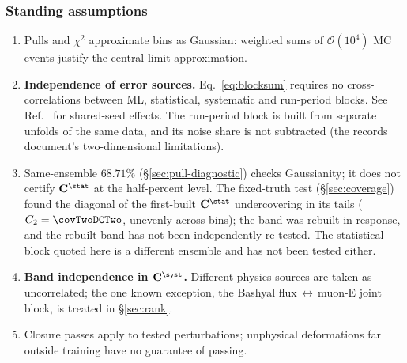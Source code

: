 \subsubsection*{Standing assumptions}

\begin{enumerate}[nosep]
  \item Pulls and $\chi^{2}$ approximate bins as Gaussian: weighted sums of $\mathcal{O}(10^{4})$ MC events justify the central-limit approximation.
\item \textbf{Independence of error sources.} Eq.~\eqref{eq:blocksum} requires no cross-correlations between ML, statistical, systematic and run-period blocks. See Ref.~\cite{NoteRecords2026} for shared-seed effects. The run-period block is built from separate unfolds of the same data, and its noise share is not subtracted (the records document's two-dimensional limitations).
  \item Same-ensemble $68.71\%$ (\S\ref{sec:pull-diagnostic}) checks Gaussianity; it does not certify $\mathbf{C}^{\stat}$ at the half-percent level. The fixed-truth test (\S\ref{sec:coverage}) found the diagonal of the first-built $\mathbf{C}^{\stat}$ undercovering in its tails ($C_2=\covTwoDCTwo$, unevenly across bins); the band was rebuilt in response, and the rebuilt band has not been independently re-tested. The statistical block quoted here is a different ensemble and has not been tested either.
  \item \textbf{Band independence in $\mathbf{C}^{\syst}$.} Different physics sources are taken as uncorrelated; the one known exception, the Bashyal flux\,$\leftrightarrow$\,muon-E joint block, is treated in \S\ref{sec:rank}.
  \item Closure passes apply to tested perturbations; unphysical deformations far outside training have no guarantee of passing.
\end{enumerate}

